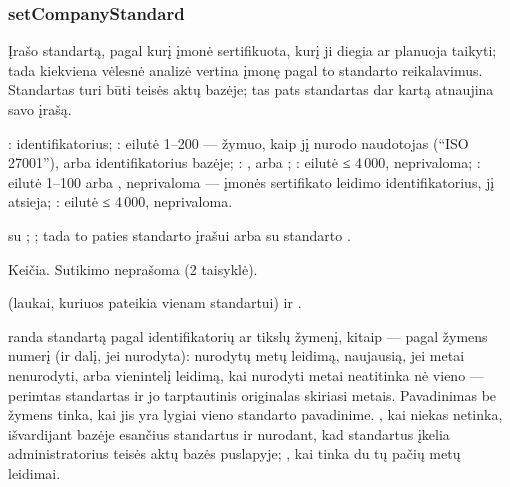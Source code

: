 \subsubsection{setCompanyStandard}\label{sec:tools:setCompanyStandard}
\begin{description}[style=multiline, leftmargin=19mm, labelwidth=17mm, labelsep=2mm,
  font=\sffamily\bfseries\footnotesize\color{ink}, itemsep=1pt, topsep=2pt, before=\raggedright]
  \item[Paskirtis] Įrašo standartą, pagal kurį įmonė sertifikuota, kurį ji diegia ar planuoja
    taikyti; tada kiekviena vėlesnė analizė vertina įmonę pagal to standarto reikalavimus.
    Standartas turi būti teisės aktų bazėje; tas pats standartas dar kartą atnaujina savo
    įrašą.
  \item[Įvestis] : identifikatorius; : eilutė 1--200 ---
    žymuo, kaip jį nurodo naudotojas (\enquote{ISO 27001}), arba identifikatorius bazėje;
    : ,  arba ; :
    eilutė ≤ 4\,000, neprivaloma; : eilutė 1--100 arba ,
    neprivaloma --- įmonės sertifikato leidimo identifikatorius,  jį atsieja;
    : eilutė ≤ 4\,000, neprivaloma.
  \item[Užklausos]  su ;
    ; tada
     to paties standarto įrašui arba
     su standarto .
  \item[Pobūdis] Keičia. Sutikimo neprašoma (2 taisyklė).
  \item[Grąžina]  (laukai, kuriuos  pateikia vienam
    standartui) ir .
  \item[Klaidos]  randa standartą pagal identifikatorių ar tikslų žymenį,
    kitaip --- pagal žymens numerį (ir dalį, jei nurodyta): nurodytų metų leidimą, naujausią,
    jei metai nenurodyti, arba vienintelį leidimą, kai nurodyti metai neatitinka nė vieno ---
    perimtas standartas ir jo tarptautinis originalas skiriasi metais. Pavadinimas be žymens
    tinka, kai jis yra lygiai vieno standarto pavadinime. , kai niekas
    netinka, išvardijant bazėje esančius standartus ir nurodant, kad standartus įkelia
    administratorius teisės aktų bazės puslapyje; , kai tinka du tų
    pačių metų leidimai.
\end{description}

